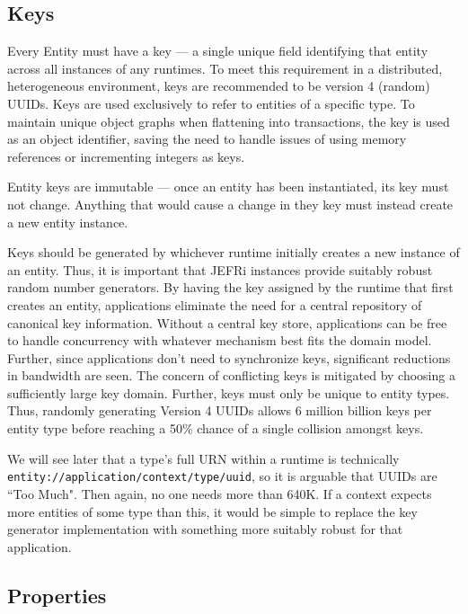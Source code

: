 \documentclass{article}
\newcommand{\ilcode}{\tt}
\begin{document}
\subsection{Keys}

Every Entity must have a key --- a single unique field identifying that entity
across all instances of any runtimes. To meet this requirement in a distributed,
heterogeneous environment, keys are recommended to be version 4 (random) UUIDs.
Keys are used exclusively to refer to entities of a specific type. To maintain
unique object graphs when flattening into transactions, the key is used as an
object identifier, saving the need to handle issues of using memory references
or incrementing integers as keys.

Entity keys are immutable --- once an entity has been instantiated, its key must
not change. Anything that would cause a change in they key must instead create
a new entity instance.

Keys should be generated by whichever runtime initially creates a new instance
of an entity. Thus, it is important that JEFRi instances provide suitably robust
random number generators. By having the key assigned by the runtime that first
creates an entity, applications eliminate the need for a central repository of
canonical key information. Without a central key store, applications can be free
to handle concurrency with whatever mechanism best fits the domain model.
Further, since applications don't need to synchronize keys, significant
reductions in bandwidth are seen. The concern of conflicting keys is mitigated
by choosing a sufficiently large key domain. Further, keys must only be unique
to entity types. Thus, randomly generating Version 4 UUIDs allows 6 million
billion keys per entity type before reaching a 50\% chance of a single collision
amongst keys.

We will see later that a type's full URN within a runtime is technically
{\ilcode entity://\-application/\-context/\-type/\-uuid}, so it is arguable that
UUIDs are ``Too Much". Then again, no one needs more than 640K. If a context
expects more entities of some type than this, it would be simple to replace the
key generator implementation with something more suitably robust for that
application.

\subsection{Properties}
\end{document}
